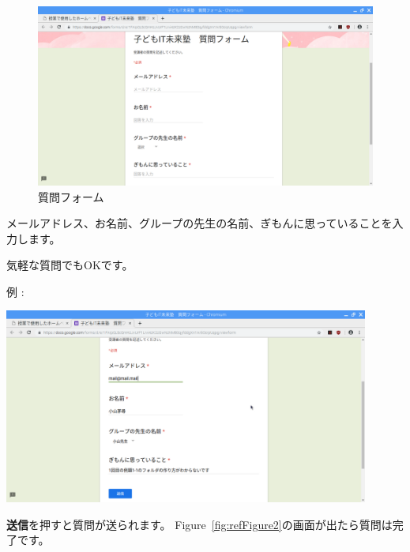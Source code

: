\begin{figure}[H]
  
    \begin{center}
      
      \includegraphics[width=\textwidth]{./text08-img/textbook-img067.png}
      \caption{\label{fig:refFigure1}質問フォーム}
    \end{center}
    
\end{figure}


\bigskip


メールアドレス、お名前、グループの先生の名前、ぎもんに思っていることを入力します。

気軽な質問でもOKです。

例 :



\begin{center}
\includegraphics[width=0.9\textwidth]{./text08-img/textbook-img068.png}

\end{center}

\bigskip


\bigskip

\textbf{送信}を押すと質問が送られます。
Figure~\ref{fig:refFigure2}の画面が出たら質問は完了です。



